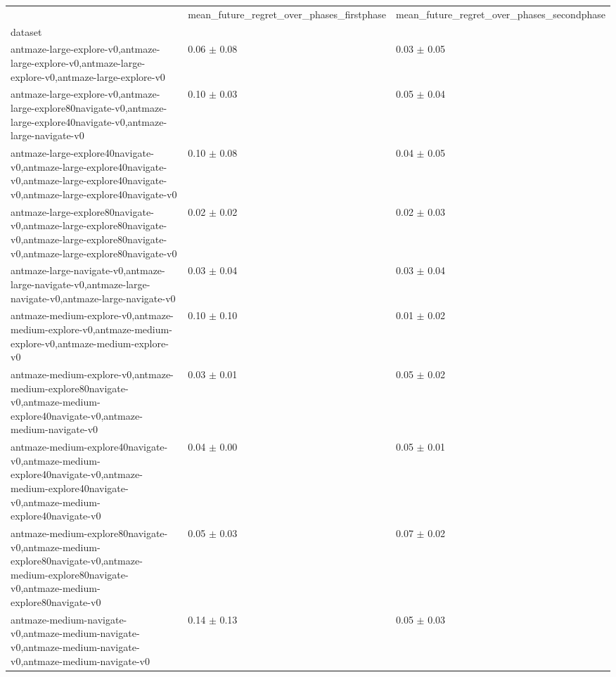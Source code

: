\begin{tabular}{lll}
\toprule
 & mean_future_regret_over_phases_firstphase & mean_future_regret_over_phases_secondphase \\
dataset &  &  \\
\midrule
antmaze-large-explore-v0,antmaze-large-explore-v0,antmaze-large-explore-v0,antmaze-large-explore-v0 & 0.06 $\pm$ 0.08 & 0.03 $\pm$ 0.05 \\
antmaze-large-explore-v0,antmaze-large-explore80navigate-v0,antmaze-large-explore40navigate-v0,antmaze-large-navigate-v0 & 0.10 $\pm$ 0.03 & 0.05 $\pm$ 0.04 \\
antmaze-large-explore40navigate-v0,antmaze-large-explore40navigate-v0,antmaze-large-explore40navigate-v0,antmaze-large-explore40navigate-v0 & 0.10 $\pm$ 0.08 & 0.04 $\pm$ 0.05 \\
antmaze-large-explore80navigate-v0,antmaze-large-explore80navigate-v0,antmaze-large-explore80navigate-v0,antmaze-large-explore80navigate-v0 & 0.02 $\pm$ 0.02 & 0.02 $\pm$ 0.03 \\
antmaze-large-navigate-v0,antmaze-large-navigate-v0,antmaze-large-navigate-v0,antmaze-large-navigate-v0 & 0.03 $\pm$ 0.04 & 0.03 $\pm$ 0.04 \\
antmaze-medium-explore-v0,antmaze-medium-explore-v0,antmaze-medium-explore-v0,antmaze-medium-explore-v0 & 0.10 $\pm$ 0.10 & 0.01 $\pm$ 0.02 \\
antmaze-medium-explore-v0,antmaze-medium-explore80navigate-v0,antmaze-medium-explore40navigate-v0,antmaze-medium-navigate-v0 & 0.03 $\pm$ 0.01 & 0.05 $\pm$ 0.02 \\
antmaze-medium-explore40navigate-v0,antmaze-medium-explore40navigate-v0,antmaze-medium-explore40navigate-v0,antmaze-medium-explore40navigate-v0 & 0.04 $\pm$ 0.00 & 0.05 $\pm$ 0.01 \\
antmaze-medium-explore80navigate-v0,antmaze-medium-explore80navigate-v0,antmaze-medium-explore80navigate-v0,antmaze-medium-explore80navigate-v0 & 0.05 $\pm$ 0.03 & 0.07 $\pm$ 0.02 \\
antmaze-medium-navigate-v0,antmaze-medium-navigate-v0,antmaze-medium-navigate-v0,antmaze-medium-navigate-v0 & 0.14 $\pm$ 0.13 & 0.05 $\pm$ 0.03 \\
\bottomrule
\end{tabular}
